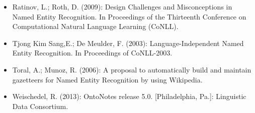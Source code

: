 \documentclass[a4paper, 11pt]{article}
\begin{document}
\begin{itemize}
				\item Ratinov, L.; Roth, D. (2009): Design Challenges and Misconceptions in Named Entity Recognition. In Proceedings of the Thirteenth Conference on Computational Natural Language Learning (CoNLL).
				\item Tjong Kim Sang,E.; De Meulder, F. (2003): Language-Independent Named Entity Recognition. In
				Proceedings of 	CoNLL-2003.\\
				\item Toral, A.; Munoz, R. (2006): A proposal to automatically build and maintain gazetteers for Named Entity Recognition by using Wikipedia.\\
				\item Weischedel, R. (2013): OntoNotes release 5.0. [Philadelphia, Pa.]: Linguistic Data Consortium.\\
\end{itemize}
\end{document}
